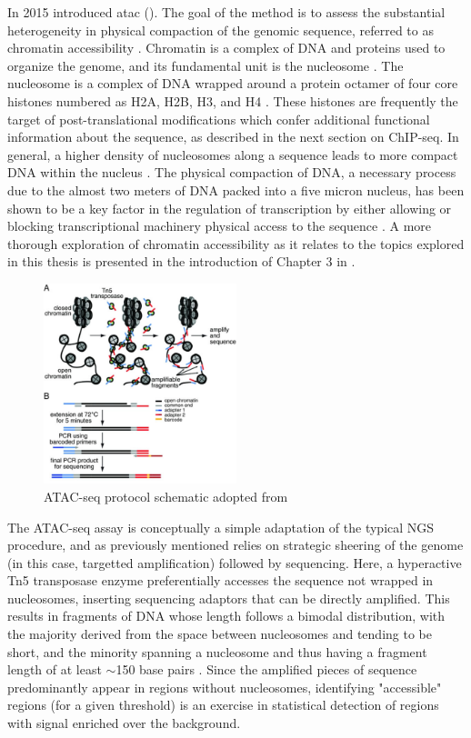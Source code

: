 In 2015 \textcite{Buenrostro2015a} introduced \gls{atac} (). The goal of the method is to assess the substantial heterogeneity in physical compaction of the genomic sequence, referred to as chromatin accessibility \cite{Thurman2012a}. Chromatin is a complex of DNA and proteins used to organize the genome, and its fundamental unit is the nucleosome \cite{Bell2011a}. The nucleosome is a complex of DNA wrapped around a protein octamer of four core histones numbered as H2A, H2B, H3, and H4 \cite{Bell2011a}. These histones are frequently the target of post-translational modifications which confer additional functional information about the sequence, as described in the next section on ChIP-seq. In general, a higher density of nucleosomes along a sequence leads to more compact DNA within the nucleus \cite{Kornberg1974}.  
The physical compaction of DNA, a necessary process due to the almost two meters of DNA packed into a five micron nucleus, has been shown to be a key factor in the regulation of transcription by either allowing or blocking transcriptional machinery physical access to the sequence \cite{Bell2011,Gross2003}. A more thorough exploration of chromatin accessibility as it relates to the topics explored in this thesis is presented in the introduction of Chapter 3 in . 

\begin{figure}
    \centering
    \includegraphics[width=0.5\textwidth]{plot/ch1/atac.jpg}
    \caption{ATAC-seq protocol schematic adopted from \cite{Buenrostro2015a}}
    \label{fig:atac}
\end{figure}

The ATAC-seq assay is conceptually a simple adaptation of the typical NGS procedure, and as previously mentioned relies on strategic sheering of the genome (in this case, targetted amplification) followed by sequencing. Here, a hyperactive Tn5 transposase enzyme preferentially accesses the sequence not wrapped in nucleosomes, inserting sequencing adaptors that can be directly amplified. This results in fragments of DNA whose length follows a bimodal distribution, with the majority derived from the space between nucleosomes and tending to be short, and the minority spanning a nucleosome and thus having a fragment length of at least $\sim$150 base pairs \cite{Yan2020a}. Since the amplified pieces of sequence predominantly appear in regions without nucleosomes, identifying "accessible" regions (for a given threshold) is an exercise in statistical detection of regions with signal enriched over the background.

